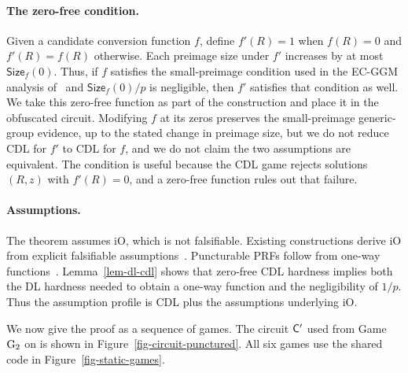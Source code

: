 \paragraph*{The zero-free condition.} Given a candidate conversion function $f$, define $f'(R)=1$ when $f(R)=0$ and $f'(R)=f(R)$ otherwise. Each preimage size under $f'$ increases by at most $\mathsf{Size}_f(0)$. Thus, if $f$ satisfies the small-preimage condition used in the EC-GGM analysis of~\cite{C:CFOS25} and $\mathsf{Size}_f(0)/p$ is negligible, then $f'$ satisfies that condition as well. We take this zero-free function as part of the construction and place it in the obfuscated circuit. Modifying $f$ at its zeros preserves the small-preimage generic-group evidence, up to the stated change in preimage size, but we do not reduce CDL for $f'$ to CDL for $f$, and we do not claim the two assumptions are equivalent. The condition is useful because the CDL game rejects solutions $(R,z)$ with $f'(R)=0$, and a zero-free function rules out that failure.

\paragraph*{Assumptions.} The theorem assumes iO, which is not falsifiable. Existing constructions derive iO from explicit falsifiable assumptions~\cite{STOC:JaiLinSah21,EC:JaiLinSah22}. Puncturable PRFs follow from one-way functions~\cite{AC:BonWat13,EC:BoyGilIsh15,CCS:KPTZ13}. Lemma~\ref{lem-dl-cdl} shows that zero-free CDL hardness implies both the DL hardness needed to obtain a one-way function and the negligibility of $1/p$. Thus the assumption profile is CDL plus the assumptions underlying iO.

We now give the proof as a sequence of games. The circuit $\mathsf{C}'$ used from Game~$\textnormal{G}_2$ on is shown in Figure~\ref{fig-circuit-punctured}. All six games use the shared code in Figure~\ref{fig-static-games}.

\FloatBarrier

